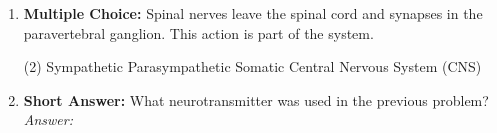 \begin{enumerate}[label=\textbf{Q3.5.\arabic*}]
    \item \textbf{Multiple Choice:} Spinal nerves leave the spinal cord and synapses in the paravertebral ganglion. This action is part of the \underline{\hspace{3cm}} system.
        \begin{tasks}[label=\textcolor{\documentTheme}{(\Alph*)}, item-format=\color{\documentTheme}, label-width=1.5em, item-indent=1.7em](2)
            \task Sympathetic
            \task Parasympathetic
            \task Somatic
            \task Central Nervous System (CNS)
        \end{tasks}

    \item \textbf{Short Answer:} What neurotransmitter was used in the previous problem? \\
        \textit{Answer:} \\%
\end{enumerate}




